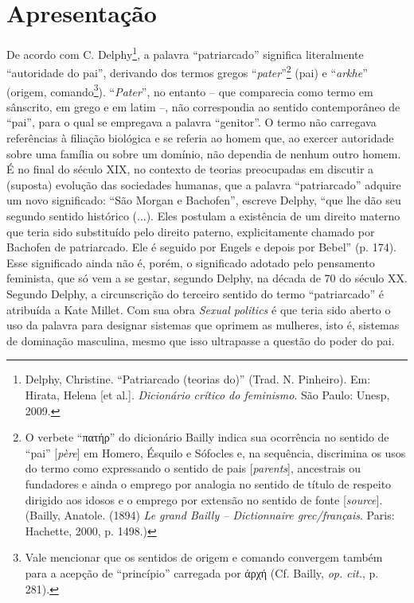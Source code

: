 \chapter{Apresentação}

De acordo com C. Delphy\footnote{Delphy, Christine. ``Patriarcado
  (teorias do)'' (Trad. N. Pinheiro). Em: Hirata, Helena {[}et al.{]}.
  \emph{Dicionário crítico do feminismo}. São Paulo: Unesp, 2009.}, a
palavra ``patriarcado'' significa literalmente ``autoridade do pai'',
derivando dos termos gregos ``\emph{pater}''\footnote{O verbete
  ``πατήρ'' do dicionário Bailly indica sua ocorrência no sentido de
  ``pai'' {[}\emph{père}{]} em Homero, Ésquilo e Sófocles e, na
  sequência, discrimina os usos do termo como expressando o sentido de
  pais {[}\emph{parents}{]}, ancestrais ou fundadores e ainda o emprego
  por analogia no sentido de título de respeito dirigido aos idosos e o
  emprego por extensão no sentido de fonte {[}\emph{source}{]}. (Bailly,
  Anatole. (1894) \emph{Le grand Bailly -- Dictionnaire grec/français}.
  Paris: Hachette, 2000, p. 1498.)} (pai) e ``\emph{arkhe}'' (origem,
comando\footnote{Vale mencionar que os sentidos de origem e comando
  convergem também para a acepção de ``princípio'' carregada por άρχή
  (Cf. Bailly, \emph{op. cit.}, p. 281).}). ``\emph{Pater}'', no entanto
-- que comparecia como termo em sânscrito, em grego e em latim --, não
correspondia ao sentido contemporâneo de ``pai'', para o qual se
empregava a palavra ``genitor''. O termo não carregava referências à
filiação biológica e se referia ao homem que, ao exercer autoridade
sobre uma família ou sobre um domínio, não dependia de nenhum outro
homem. É no final do século XIX, no contexto de teorias preocupadas em
discutir a (suposta) evolução das sociedades humanas, que a palavra
``patriarcado'' adquire um novo significado: ``São Morgan e Bachofen'',
escreve Delphy, ``que lhe dão seu segundo sentido histórico (...). Eles
postulam a existência de um direito materno que teria sido substituído
pelo direito paterno, explicitamente chamado por Bachofen de
patriarcado. Ele é seguido por Engels e depois por Bebel'' (p. 174).
Esse significado ainda não é, porém, o significado adotado pelo
pensamento feminista, que só vem a se gestar, segundo Delphy, na década
de 70 do século XX. Segundo Delphy, a circunscrição do terceiro sentido
do termo ``patriarcado'' é atribuída a Kate Millet. Com sua obra
\emph{Sexual politics} é que teria sido aberto o uso da palavra para
designar sistemas que oprimem as mulheres, isto é, sistemas de dominação
masculina, mesmo que isso ultrapasse a questão do poder do pai.

